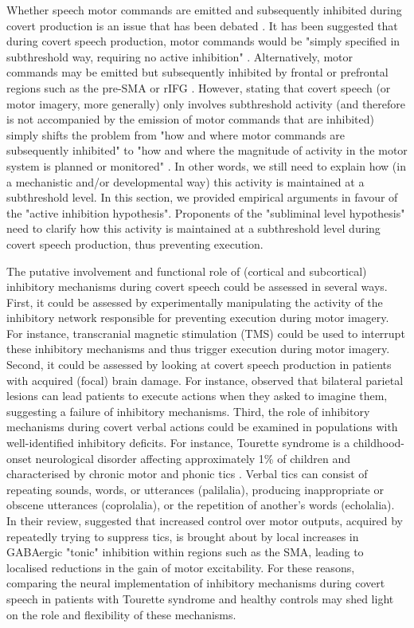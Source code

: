 \documentclass[utf8]{template/frontiersSCNS} %
\begin{document}
Whether speech motor commands are emitted and subsequently inhibited during covert production is an issue that has been debated \citep[e.g.,][]{geva_inner_2018}. It has been suggested that during covert speech production, motor commands would be "simply specified in subthreshold way, requiring no active inhibition" \citep{geva_inner_2018}. Alternatively, motor commands may be emitted but subsequently inhibited by frontal or prefrontal regions such as the pre-SMA or rIFG \citep[e.g.,][]{jeannerod_neural_2001, loevenbruck_cognitive_2018, grandchamp_condialint_2019}. However, stating that covert speech (or motor imagery, more generally) only involves subthreshold activity (and therefore is not accompanied by the emission of motor commands that are inhibited) simply shifts the problem from "how and where motor commands are subsequently inhibited" to "how and where the magnitude of activity in the motor system is planned or monitored" \citep[see also][]{scheil_motor_2018}. In other words, we still need to explain how (in a mechanistic and/or developmental way) this activity is maintained at a subthreshold level. In this section, we provided empirical arguments in favour of the "active inhibition hypothesis". Proponents of the "subliminal level hypothesis" need to clarify how this activity is maintained at a subthreshold level during covert speech production, thus preventing execution.

The putative involvement and functional role of (cortical and subcortical) inhibitory mechanisms during covert speech could be assessed in several ways. First, it could be assessed by experimentally manipulating the activity of the inhibitory network responsible for preventing execution during motor imagery. For instance, transcranial magnetic stimulation (TMS) could be used to interrupt these inhibitory mechanisms and thus trigger execution during motor imagery. Second, it could be assessed by looking at covert speech production in patients with acquired (focal) brain damage. For instance, \cite{schwoebel_man_2002} observed that bilateral parietal lesions can lead patients to execute actions when they asked to imagine them, suggesting a failure of inhibitory mechanisms. Third, the role of inhibitory mechanisms during covert verbal actions could be examined in populations with well-identified inhibitory deficits. For instance, Tourette syndrome is a childhood-onset neurological disorder affecting approximately 1\% of children and characterised by chronic motor and phonic tics \citep{jackson_inhibition_2015}. Verbal tics can consist of repeating sounds, words, or utterances (palilalia), producing inappropriate or obscene utterances (coprolalia), or the repetition of another’s words (echolalia). In their review, \cite{jackson_inhibition_2015} suggested that increased control over motor outputs, acquired by repeatedly trying to suppress tics, is brought about by local increases in GABAergic "tonic" inhibition within regions such as the SMA, leading to localised reductions in the gain of motor excitability. For these reasons, comparing the neural implementation of inhibitory mechanisms during covert speech in patients with Tourette syndrome and healthy controls may shed light on the role and flexibility of these mechanisms.
\end{document}
